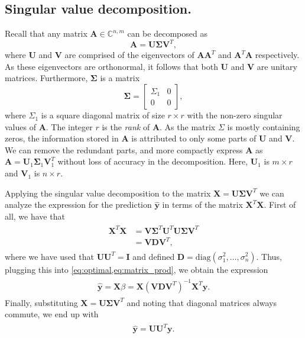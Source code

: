 \documentclass[dvipsnames, article, a4paper, oneside, 12pt]{memoir}
\newcommand{\C}{\mathbb{C}}
\newcommand{\X}{\bm{X}}
\newcommand{\diag}[1]{\mathrm{diag}(#1)}
\newcommand{\mat}[1]{\bm{#1}}
\newcommand{\y}{\bm{y}}
\begin{document}
  \subsection{Singular value decomposition.}
  
  Recall that any matrix \( \mat{A} \in \C^{n, m} \) can be decomposed as
  \begin{equation}
    \mat{A} = \mat{U} \mat{\Sigma}\mat{V}^T,
  \end{equation}
  where \( \mat{U} \) and \( \mat{V} \) are comprised of the eigenvectors of \(
  \mat{A}\mat{A}^T \) and \( \mat{A}^T\mat{A} \) respectively. As these
  eigenvectors are orthonormal, it follows that both \( \mat{U} \) and \(
  \mat{V} \) are unitary matrices. Furthermore, \( \mat{\Sigma} \) is a matrix 
  \begin{equation}
    \mat{\Sigma} = \begin{bmatrix}
      \Sigma_1 & 0 \\
       0 & 0
    \end{bmatrix},
  \end{equation}
  where \( \Sigma_1 \) is a square diagonal matrix of size \( r \times r \)
  with the non-zero singular values of \( \mat{A} \). The integer \( r \) is
  the \emph{rank} of \( \mat{A} \). As the matrix \( \Sigma \) is mostly
  containing zeros, the information stored in \( \mat{A} \) is attributed to
  only some parts of \( \mat{U} \) and \( \mat{V} \). We can remove the
  redundant parts, and more compactly express \( \mat{A} \) as \( \mat{A} =
  \mat{U}_1 \mat{\Sigma}_1 \mat{V}_1^T \) without loss of accuracy in the
  decomposition. Here, \( \mat{U}_1 \) is \( m \times r \) and \( \mat{V}_1 \)
  is \( n \times r \).

  Applying the singular value decomposition to the matrix \(\X = \mat{U}
  \mat{\Sigma} \mat{V}^T\) we can analyze the expression for the prediction \( \hat{\y} \)
  in terms of the matrix \( \X^T \X \).  First of all, we have that
  \begin{align}
    \begin{split}
    \X^T \X &= \mat{V}\mat{\Sigma}^T\mat{U}^T\mat{U}\mat{\Sigma} \mat{V}^T\\
            &= \mat{V}\mat{D}\mat{V}^T, 
    \end{split}
  \end{align}
  where we have used that \( \mat{U}\mat{U}^T = \mat{I} \) and defined \(
  \mat{D} = \diag{\sigma_1^2, \ldots, \sigma_n^2} \).  Thus, plugging this into
  \cref{eq:optimal,eq:matrix_prod}, we obtain the expression
  \begin{align}
    \begin{split}
      \hat{\y} = \X \beta = \X (\mat{V}\mat{D}\mat{V}^T)^{-1} \mat{X}^T \y.
    \end{split}
  \end{align}
  Finally, substituting \( \X = \mat{U}\mat{\Sigma}\mat{V}^T \) and noting that
  diagonal matrices always commute, we end up with
  \begin{align}
    \begin{split}
      \hat{\y} = \mat{U}\mat{U}^T \mat{y}.
    \end{split}
  \end{align}
\end{document}
